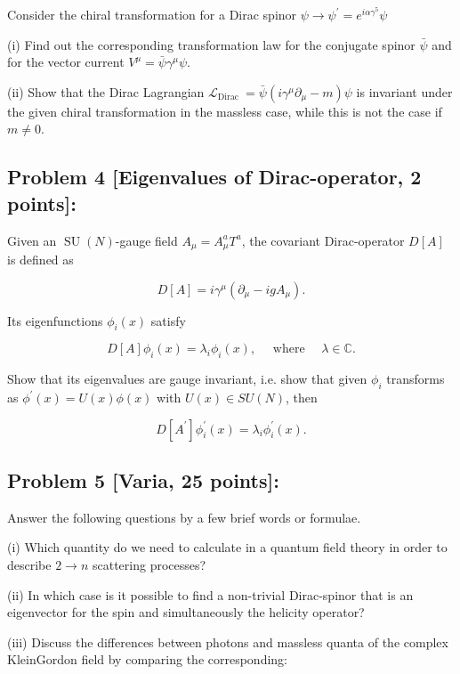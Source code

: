 \documentclass[10pt, letterpaper]{article}
\begin{document}
Consider the chiral transformation for a Dirac spinor $\psi \rightarrow \psi^{\prime}=e^{i \alpha \gamma^5} \psi$

(i) Find out the corresponding transformation law for the conjugate spinor $\bar{\psi}$ and for the vector current $V^\mu=\bar{\psi} \gamma^\mu \psi$.

(ii) Show that the Dirac Lagrangian $\mathcal{L}_{\text {Dirac }}=\bar{\psi}\left(i \gamma^\mu \partial_\mu-m\right) \psi$ is invariant under the given chiral transformation in the massless case, while this is not the case if $m \neq 0$.

\subsection{Problem 4 [Eigenvalues of Dirac-operator, 2 points]:}

Given an $\operatorname{SU}(N)$-gauge field $A_\mu=A_\mu^a T^a$, the covariant Dirac-operator $D[A]$ is defined as

$$
D[A]=i \gamma^\mu\left(\partial_\mu-i g A_\mu\right) .
$$

Its eigenfunctions $\phi_i(x)$ satisfy

$$
D[A] \phi_i(x)=\lambda_i \phi_i(x), \quad \text { where } \quad \lambda \in \mathbb{C} .
$$

Show that its eigenvalues are gauge invariant, i.e. show that given $\phi_i$ transforms as $\phi^{\prime}(x)= U(x) \phi(x)$ with $U(x) \in S U(N)$, then

$$
D\left[A^{\prime}\right] \phi_i^{\prime}(x)=\lambda_i \phi_i^{\prime}(x) .
$$



\subsection{Problem 5 [Varia, 25 points]:}

Answer the following questions by a few brief words or formulae.

(i) Which quantity do we need to calculate in a quantum field theory in order to describe $2 \rightarrow n$ scattering processes?

(ii) In which case is it possible to find a non-trivial Dirac-spinor that is an eigenvector for the spin and simultaneously the helicity operator?

(iii) Discuss the differences between photons and massless quanta of the complex KleinGordon field by comparing the corresponding:
\end{document}
